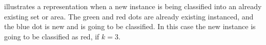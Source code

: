 \bigskip

 illustrates a representation when a new instance is being classified into an already existing set or area.
The green and red dots are already existing instanced, and the blue dot is new and is going to be classified.
In this case the new instance is going to be classified as red, if $k=3$.




